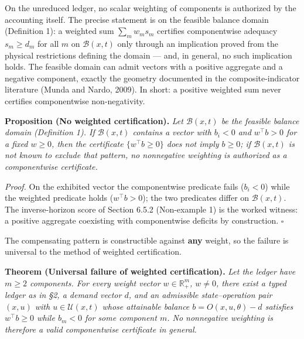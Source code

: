 \documentclass[11pt]{article}
\begin{document}
On the unreduced ledger, no scalar weighting of components is authorized by the accounting itself. The precise statement is on the feasible balance domain (Definition 1): a weighted sum \(\sum_m w_m s_m\) certifies componentwise adequacy \(s_m \ge d_m\) for all \(m\) on \(\mathcal{B}(x,t)\) only through an implication proved from the physical restrictions defining the domain --- and, in general, no such implication holds. The feasible domain can admit vectors with a positive aggregate and a negative component, exactly the geometry documented in the composite-indicator literature (Munda and Nardo, 2009). In short: a positive weighted sum never certifies componentwise non-negativity.

\textbf{Proposition (No weighted certification).} \emph{Let \(\mathcal{B}(x,t)\) be the feasible balance domain (Definition 1). If \(\mathcal{B}(x,t)\) contains a vector with \(b_i < 0\) and \(w^\top b > 0\) for a fixed \(w \ge 0\), then the certificate \(\{w^\top b \ge 0\}\) does not imply \(b \ge 0\); if \(\mathcal{B}(x,t)\) is not known to exclude that pattern, no nonnegative weighting is authorized as a componentwise certificate.}

\emph{Proof.} On the exhibited vector the componentwise predicate fails (\(b_i < 0\)) while the weighted predicate holds (\(w^\top b > 0\)); the two predicates differ on \(\mathcal{B}(x,t)\). The inverse-horizon score of Section 6.5.2 (Non-example 1) is the worked witness: a positive aggregate coexisting with componentwise deficits by construction. \(\square\)

The compensating pattern is constructible against \textbf{any} weight, so the failure is universal to the method of weighted certification.

\textbf{Theorem (Universal failure of weighted certification).} \emph{Let the ledger have \(m \ge 2\) components. For every weight vector \(w\in\mathbb R^m_+\), \(w\ne0\), there exist a typed ledger as in \S2, a demand vector \(d\), and an admissible state--operation pair \((x,u)\) with \(u\in\mathcal U(x,t)\) whose attainable balance \(b=O(x,u,\theta)-d\) satisfies \(w^{\top}b\ge0\) while \(b_m<0\) for some component \(m\). No nonnegative weighting is therefore a valid componentwise certificate in general.}
\end{document}
